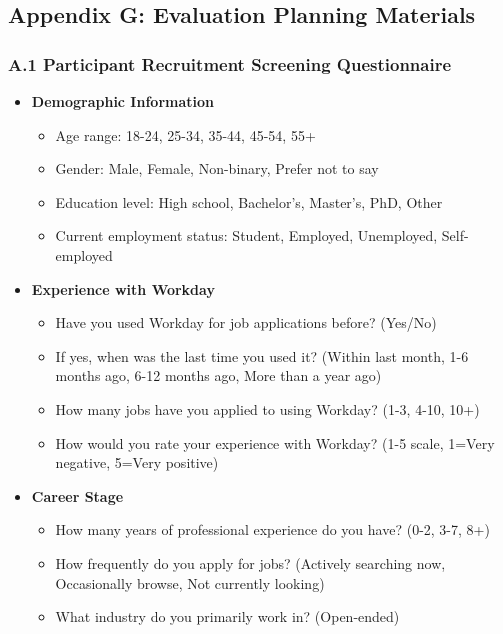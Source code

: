 \documentclass[
	letterpaper, %
]{jdf}
\begin{document}
\begin{sloppypar}
\subsection{Appendix G: Evaluation Planning Materials}

\subsubsection{A.1 Participant Recruitment Screening Questionnaire}

\begin{itemize}
    \item \textbf{Demographic Information}
    \begin{itemize}
        \item Age range: 18-24, 25-34, 35-44, 45-54, 55+
        \item Gender: Male, Female, Non-binary, Prefer not to say
        \item Education level: High school, Bachelor's, Master's, PhD, Other
        \item Current employment status: Student, Employed, Unemployed, Self-employed
    \end{itemize}
    
    \item \textbf{Experience with Workday}
    \begin{itemize}
        \item Have you used Workday for job applications before? (Yes/No)
        \item If yes, when was the last time you used it? (Within last month, 1-6 months ago, 6-12 months ago, More than a year ago)
        \item How many jobs have you applied to using Workday? (1-3, 4-10, 10+)
        \item How would you rate your experience with Workday? (1-5 scale, 1=Very negative, 5=Very positive)
    \end{itemize}
    
    \item \textbf{Career Stage}
    \begin{itemize}
        \item How many years of professional experience do you have? (0-2, 3-7, 8+)
        \item How frequently do you apply for jobs? (Actively searching now, Occasionally browse, Not currently looking)
        \item What industry do you primarily work in? (Open-ended)
    \end{itemize}
\end{itemize}


\end{sloppypar}
\end{document}
